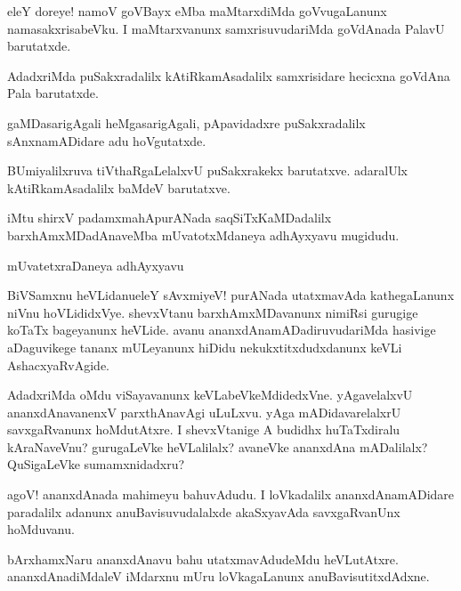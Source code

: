 \begin{mng}
eleY doreye! namoV goVBayx eMba maMtarxdiMda goVvugaLanunx namasakxrisabeVku. I maMtarxvanunx samxrisuvudariMda goVdAnada PalavU barutatxde.
\end{mng}

\begin{mng}
AdadxriMda puSakxradalilx kAtiRkamAsadalilx samxrisidare hecicxna goVdAna Pala barutatxde.
\end{mng}

\begin{mng}
gaMDasarigAgali heMgasarigAgali, pApavidadxre puSakxradalilx sAnxnamADidare adu hoVgutatxde.
\end{mng}

\begin{mng}
BUmiyalilxruva tiVthaRgaLelalxvU puSakxrakekx barutatxve. adaralUlx kAtiRkamAsadalilx baMdeV barutatxve.
\end{mng}
iMtu shirxV padamxmahApurANada saqSiTxKaMDadalilx barxhAmxMDadAnaveMba mUvatotxMdaneya adhAyxyavu mugidudu.

\begin{center}
mUvatetxraDaneya adhAyxyavu
\end{center}

\begin{mng}
BiVSamxnu heVLidanu\mdash eleY sAvxmiyeV! purANada utatxmavAda kathegaLanunx niVnu hoVLididxVye. shevxVtanu barxhAmxMDavanunx nimiRsi gurugige koTaTx bageyanunx heVLide. avanu ananxdAnamADadiruvudariMda hasivige aDaguvikege tananx mULeyanunx hiDidu nekukxtitxdudxdanunx keVLi AshacxyaRvAgide.
\end{mng}

\begin{mng}
AdadxriMda oMdu viSayavanunx keVLabeVkeMdidedxVne. yAgavelalxvU ananxdAnavanenxV parxthAnavAgi uLuLxvu. yAga mADidavarelalxrU savxgaRvanunx hoMdutAtxre. I shevxVtanige A budidhx huTaTxdiralu kAraNaveVnu? gurugaLeVke heVLalilalx? avaneVke ananxdAna mADalilalx? QuSigaLeVke sumamxnidadxru?
\end{mng}

\begin{mng}
agoV! ananxdAnada mahimeyu bahuvAdudu. I loVkadalilx ananxdAnamADidare paradalilx adanunx anuBavisuvudalalxde akaSxyavAda savxgaRvanUnx hoMduvanu.
\end{mng}

\begin{mng}
bArxhamxNaru ananxdAnavu bahu utatxmavAdudeMdu heVLutAtxre. ananxdAnadiMdaleV iMdarxnu mUru loVkagaLanunx anuBavisutitxdAdxne.
\end{mng}

